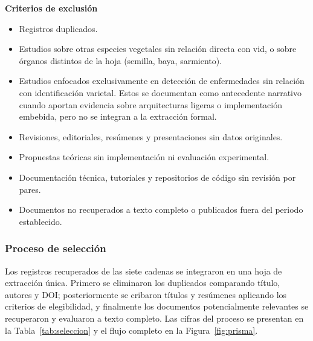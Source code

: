 \textbf{Criterios de exclusión}
\begin{itemize}
    \item Registros duplicados.
    \item Estudios sobre otras especies vegetales sin relación directa con vid,
    o sobre órganos distintos de la hoja (semilla, baya, sarmiento).
    \item Estudios enfocados exclusivamente en detección de enfermedades sin
    relación con identificación varietal. Estos se documentan como antecedente
    narrativo cuando aportan evidencia sobre arquitecturas ligeras o
    implementación embebida, pero no se integran a la extracción formal.
    \item Revisiones, editoriales, resúmenes y presentaciones sin datos
    originales.
    \item Propuestas teóricas sin implementación ni evaluación experimental.
    \item Documentación técnica, tutoriales y repositorios de código sin
    revisión por pares.
    \item Documentos no recuperados a texto completo o publicados fuera del
    periodo establecido.
\end{itemize}

\subsubsection{Proceso de selección}

Los registros recuperados de las siete cadenas se integraron en una hoja de
extracción única. Primero se eliminaron los duplicados comparando título,
autores y DOI; posteriormente se cribaron títulos y resúmenes aplicando los
criterios de elegibilidad, y finalmente los documentos potencialmente
relevantes se recuperaron y evaluaron a texto completo. Las cifras del
proceso se presentan en la Tabla~\ref{tab:seleccion} y el flujo completo en
la Figura~\ref{fig:prisma}.

